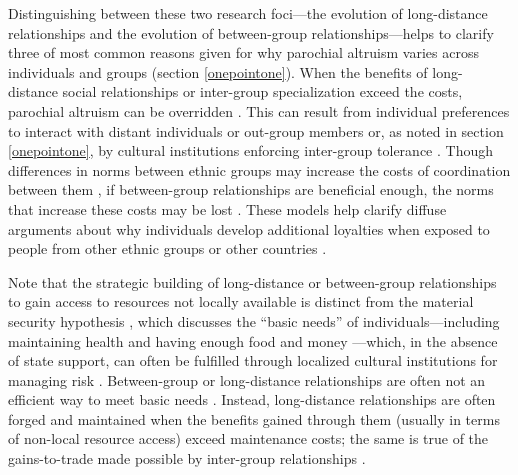 \documentclass[bibauthoryear]{aa}
\begin{document}
Distinguishing between these two research foci---the evolution of long-distance relationships and the evolution of between-group relationships---helps to clarify three of most common reasons given for why parochial altruism varies across individuals and groups (section \ref{onepointone}). When the benefits of long-distance social relationships or inter-group specialization exceed the costs, parochial altruism can be overridden \citep[e.g.,][]{bellmoya}. This can result from individual preferences to interact with distant individuals \citep{pisor2019evolution} or out-group members \citep{moya2015different, brewer1976ethnocentrism} or, as noted in section \ref{onepointone}, by cultural institutions enforcing inter-group tolerance \citep{fearon1996explaining, fry2018evolutionary}. Though differences in norms between ethnic groups may increase the costs of coordination between them \citep{bellmoya, habyarimana2007does, mcelreath2003shared}, if between-group relationships are beneficial enough, the norms that increase these costs may be lost \citep{bunce2017interethnic, bunce2018sustainability}. These models help clarify diffuse arguments about why individuals develop additional loyalties when exposed to people from other ethnic groups or other countries \citep[e.g.,][]{brewer1976ethnocentrism, beck2006cosmopolitan, hruschka2013economic, buchan2009globalization, fukuyama2001social, mau2008cosmopolitan, singer2011expanding}. %

Note that the strategic building of long-distance or between-group relationships to gain access to resources not locally available is distinct from the material security hypothesis \citep{hruschka2013economic, hruschka2014impartial}, which discusses the ``basic needs'' of individuals---including maintaining health and having enough food and money \citep{hruschka2014impartial}---which, in the absence of state support, can often be fulfilled through localized cultural institutions for managing risk \citep{pisorjones2020}. Between-group or long-distance relationships are often not an efficient way to meet basic needs \citep{minnis1985social}. Instead, long-distance relationships are often forged and maintained when the benefits gained through them (usually in terms of non-local resource access) exceed maintenance costs; the same is true of the gains-to-trade made possible by inter-group relationships \citep{bellmoya}.
\end{document}
